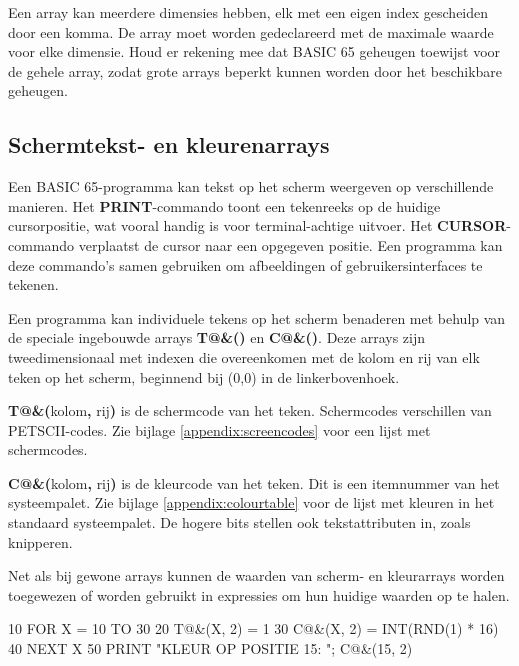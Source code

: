 Een array kan meerdere dimensies hebben, elk met een eigen index gescheiden door een komma. De array moet worden gedeclareerd met de maximale waarde voor elke dimensie. Houd er rekening mee dat BASIC 65 geheugen toewijst voor de gehele array, zodat grote arrays beperkt kunnen worden door het beschikbare geheugen.


\subsection{Schermtekst- en kleurenarrays}
\label{sec:screentextandcolourarrays}

Een BASIC 65-programma kan tekst op het scherm weergeven op verschillende manieren. Het {\bf PRINT}-commando toont een tekenreeks op de huidige cursorpositie, wat vooral handig is voor terminal-achtige uitvoer. Het {\bf CURSOR}-commando verplaatst de cursor naar een opgegeven positie. Een programma kan deze commando's samen gebruiken om afbeeldingen of gebruikersinterfaces te tekenen.

Een programma kan individuele tekens op het scherm benaderen met behulp van de speciale ingebouwde arrays \textbf{T@\&()} en \textbf{C@\&()}. Deze arrays zijn tweedimensionaal met indexen die overeenkomen met de kolom en rij van elk teken op het scherm, beginnend bij (0,0) in de linkerbovenhoek.

\textbf{T@\&(}kolom{\bf ,} rij{\bf )} is de schermcode van het teken. Schermcodes verschillen van PETSCII-codes. Zie bijlage \vref{appendix:screencodes} voor een lijst met schermcodes.

\textbf{C@\&(}kolom{\bf ,} rij{\bf )} is de kleurcode van het teken. Dit is een itemnummer van het systeempalet. Zie bijlage \vref{appendix:colourtable} voor de lijst met kleuren in het standaard systeempalet. De hogere bits stellen ook tekstattributen in, zoals knipperen.

Net als bij gewone arrays kunnen de waarden van scherm- en kleurarrays worden toegewezen of worden gebruikt in expressies om hun huidige waarden op te halen.

\begin{screencode}
10 FOR X = 10 TO 30
20 T@&(X, 2) = 1
30 C@&(X, 2) = INT(RND(1) * 16)
40 NEXT X
50 PRINT "KLEUR OP POSITIE 15: "; C@&(15, 2)
\end{screencode}

